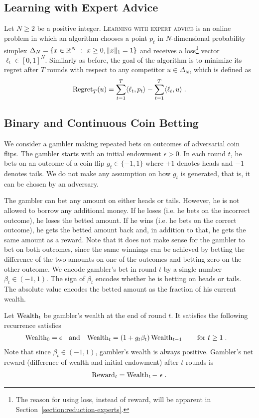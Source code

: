 \subsection{Learning with Expert Advice}

Let $N \ge 2$ be a positive integer. \textsc{Learning with expert advice} is an
online problem in which an algorithm chooses a point $p_t$ in $N$-dimensional
probability simplex $\Delta_N = \{ x \in \mathbb{R}^N ~:~ x \ge 0, \|x\|_1 = 1 \}$ and
receives a loss\footnote{The reason for using loss, instead of reward, will be
apparent in Section~\ref{section:reduction-experts}.} vector $\ell_t \in
[0,1]^N$. Similarly as before, the goal of the algorithm is to minimize its
regret after $T$ rounds with respect to any competitor $u \in \Delta_N$, which
is defined as
$$
\operatorname{Regret}_T(u) = \sum_{t=1}^T \langle \ell_t, p_t \rangle - \sum_{t=1}^T \langle \ell_t, u \rangle \; .
$$

\subsection{Binary and Continuous Coin Betting}

We consider a gambler making repeated bets on outcomes of adversarial coin
flips. The gambler starts with an initial endowment $\epsilon > 0$. In each
round $t$, he bets on an outcome of a coin flip $g_t \in \{-1,1\}$ where $+1$
denotes heads and $-1$ denotes tails. We do not make any assumption on how $g_t$
is generated, that is, it can be chosen by an adversary.

The gambler can bet any amount on either heads or tails. However, he is not
allowed to borrow any additional money. If he loses (i.e. he bets on the
incorrect outcome), he loses the betted amount. If he wins (i.e. he bets on the
correct outcome), he gets the betted amount back and, in addition to that, he
gets the same amount as a reward. Note that it does not make sense for the
gambler to bet on both outcomes, since the same winnings can be achieved by
betting the difference of the two amounts on one of the outcomes and betting
zero on the other outcome. We encode gambler's bet in round $t$ by a single
number $\beta_t \in (-1,1)$. The sign of $\beta_t$ encodes whether he is betting
on heads or tails. The absolute value encodes the betted amount as the fraction
of his current wealth.

Let $\operatorname{Wealth}_t$ be gambler's wealth at the end of round $t$. It satisfies the
following recurrence satisfies
\begin{align}
\label{equation:wealth-recurrence}
\operatorname{Wealth}_0 & = \epsilon &
& \text{and} &
\operatorname{Wealth}_t & = (1 + g_t \beta_t) \operatorname{Wealth}_{t-1} \qquad \text{for $t \ge 1$} \; .
\end{align}
Note that since $\beta_t \in (-1,1)$, gambler's wealth is always positive.
Gambler's net reward (difference of wealth and initial endowment) after $t$
rounds is
\begin{align}
\label{equation:reward-wealth}
\operatorname{Reward}_t = \operatorname{Wealth}_t - \ \epsilon \; .
\end{align}

